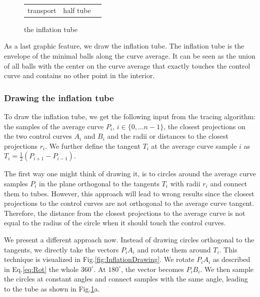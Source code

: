 \documentclass[journal, letterpaper]{IEEEtran}
\begin{document}
\begin{figure}
\begin{tabular}{ccc}
transport & half tube
		\end{tabular}
	\caption{the inflation tube}
	\label{fig:Inflation}
\end{figure}
As a last graphic feature, we draw the inflation tube. The inflation tube is the envelope of the minimal balls along the curve average.
It can be seen as the union of all balls with the center on the curve average that exactly touches the control curve and contains no other point in the interior.

\subsubsection{Drawing the inflation tube}

To draw the inflation tube, we get the following input from the tracing algorithm: the samples of the average curve $P_i$, $i\in\{0,...n-1\}$, the closest projections on the two control curves $A_i$ and $B_i$ and the radii or distances to the closest projections $r_i$. We further define the tangent $T_i$ at the average curve sample $i$ as $T_i=\frac{1}{2}(P_{i+1}-P_{i-1})$.

The first way one might think of drawing it, is to circles around the average curve samples $P_i$ in the plane orthogonal to the tangents $T_i$ with radii $r_i$ and connect them to tubes. However, this approach will lead to wrong results since the closest projections to the control curves are not orthogonal to the average curve tangent. Therefore, the distance from the closest projections to the average curve is not equal to the radius of the circle when it should touch the control curves.

We present a different approach now. Instead of drawing circles orthogonal to the tangents, we directly take the vectors $P_i A_i$ and rotate them around $T_i$. This technique is visualized in Fig.\ref{fig:InflationDrawing}. We rotate $P_i A_i$ as described in Eq.\ref{eq:Rot} the whole $360^{\circ}$. At $180^{\circ}$, the vector becomes $P_i B_i$. We then sample the circles at constant angles and connect samples with the same angle, leading to the tube as shown in Fig.\ref{fig:Inflation}a.
\end{document}
